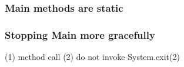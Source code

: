 \subsubsection{Main methods are static}
\subsubsection{Stopping Main more gracefully}
(1) method call 
(2) do not invoke System.exit(2) 

